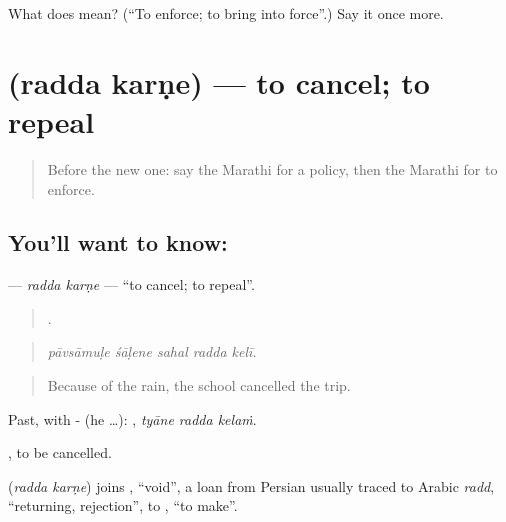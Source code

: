 \begin{tcolorbox}[breakable,colback=teal!4,colframe=teal!35!black,title={Before you move on}]
What does   mean? (\textquotedblleft{}To enforce; to bring into force\textquotedblright{}.) Say it once more.
\end{tcolorbox}
\section[\texorpdfstring{\mr{रद्द} \mr{करणे} (radda karṇe)}{रद्द करणे (radda karṇe)}]{  (radda karṇe) — to cancel; to repeal}

\label{lesson:MR-C358-radda-karne}



\begin{quote}
Before the new one: say the Marathi for a policy, then the Marathi for to enforce.
\end{quote}

\subsection*{You'll want to know:  }
\textbf{ } — \emph{radda karṇe} — \textquotedblleft{}to cancel; to repeal\textquotedblright{}.

\begin{quote}
    .
\end{quote}

\begin{quote}
\emph{pāvsāmuḷe śāḷene sahal radda kelī.}
\end{quote}

\begin{quote}
Because of the rain, the school cancelled the trip.
\end{quote}

Past, with - (he …):   , \emph{tyāne radda kelaṁ}.

 , to be cancelled.

\begin{cousinweb}
\textbf{ } (\emph{radda karṇe}) joins , \textquotedblleft{}void\textquotedblright{}, a loan from Persian usually traced to Arabic \emph{radd}, \textquotedblleft{}returning, rejection\textquotedblright{}, to , \textquotedblleft{}to make\textquotedblright{}.
\end{cousinweb}

